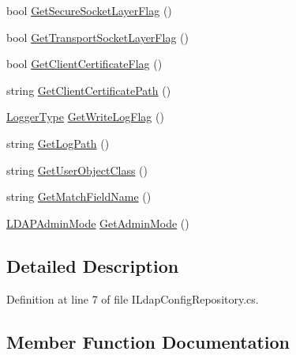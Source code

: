 \begin{DoxyCompactItemize}
\item 
bool \hyperlink{interface_l_d_a_p_library_1_1_interfarces_1_1_i_ldap_config_repository_afbaa38bdae4690c499e72691d5733c2f}{Get\+Secure\+Socket\+Layer\+Flag} ()
\item 
bool \hyperlink{interface_l_d_a_p_library_1_1_interfarces_1_1_i_ldap_config_repository_ad03509ec78ec51b28c322331ed33a939}{Get\+Transport\+Socket\+Layer\+Flag} ()
\item 
bool \hyperlink{interface_l_d_a_p_library_1_1_interfarces_1_1_i_ldap_config_repository_ae5ac45043a0ca995848ee6fe36d6f0cb}{Get\+Client\+Certificate\+Flag} ()
\item 
string \hyperlink{interface_l_d_a_p_library_1_1_interfarces_1_1_i_ldap_config_repository_a1588544b9b3d97f1a03e577190643146}{Get\+Client\+Certificate\+Path} ()
\item 
\hyperlink{namespace_l_d_a_p_library_1_1_logger_a398123fc2bb2443d0e0821044d077795}{Logger\+Type} \hyperlink{interface_l_d_a_p_library_1_1_interfarces_1_1_i_ldap_config_repository_a822fdeb0cc049d922e5d18c9a280afc1}{Get\+Write\+Log\+Flag} ()
\item 
string \hyperlink{interface_l_d_a_p_library_1_1_interfarces_1_1_i_ldap_config_repository_a8340bfe99af1222b9f231393cdd7a063}{Get\+Log\+Path} ()
\item 
string \hyperlink{interface_l_d_a_p_library_1_1_interfarces_1_1_i_ldap_config_repository_ad797d15a7d56cd9e2f90456a1903a5a6}{Get\+User\+Object\+Class} ()
\item 
string \hyperlink{interface_l_d_a_p_library_1_1_interfarces_1_1_i_ldap_config_repository_a53752b3b11c70ce04379694ccde42050}{Get\+Match\+Field\+Name} ()
\item 
\hyperlink{namespace_l_d_a_p_library_1_1_enums_aaaf5c3ff906b84752d719f58d502f15e}{L\+D\+A\+P\+Admin\+Mode} \hyperlink{interface_l_d_a_p_library_1_1_interfarces_1_1_i_ldap_config_repository_a510a9c5dde4b4fb5e4647c51997eac7e}{Get\+Admin\+Mode} ()
\end{DoxyCompactItemize}


\subsection{Detailed Description}


Definition at line 7 of file I\+Ldap\+Config\+Repository.\+cs.



\subsection{Member Function Documentation}
\hypertarget{interface_l_d_a_p_library_1_1_interfarces_1_1_i_ldap_config_repository_a3ba23f03d9f9a005f578d0e554d1a3dd}{}
